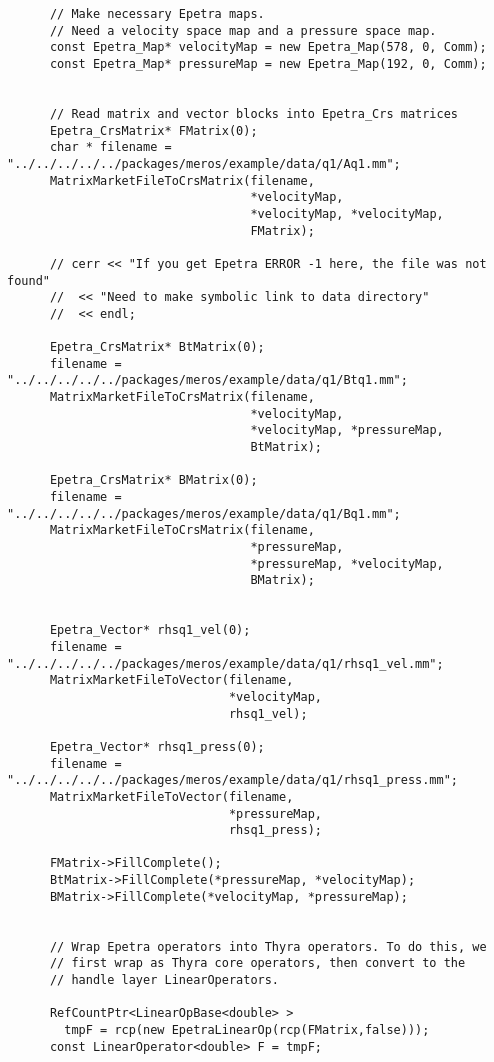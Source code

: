 \begin{verbatim}
      // Make necessary Epetra maps.
      // Need a velocity space map and a pressure space map.
      const Epetra_Map* velocityMap = new Epetra_Map(578, 0, Comm); 
      const Epetra_Map* pressureMap = new Epetra_Map(192, 0, Comm); 
 

      // Read matrix and vector blocks into Epetra_Crs matrices
      Epetra_CrsMatrix* FMatrix(0);
      char * filename = "../../../../../packages/meros/example/data/q1/Aq1.mm";
      MatrixMarketFileToCrsMatrix(filename,
                                  *velocityMap,
                                  *velocityMap, *velocityMap,
                                  FMatrix);

      // cerr << "If you get Epetra ERROR -1 here, the file was not found"
      //  << "Need to make symbolic link to data directory" 
      //  << endl;

      Epetra_CrsMatrix* BtMatrix(0);
      filename = "../../../../../packages/meros/example/data/q1/Btq1.mm";
      MatrixMarketFileToCrsMatrix(filename,
                                  *velocityMap, 
                                  *velocityMap, *pressureMap,
                                  BtMatrix);

      Epetra_CrsMatrix* BMatrix(0);
      filename = "../../../../../packages/meros/example/data/q1/Bq1.mm";
      MatrixMarketFileToCrsMatrix(filename,
                                  *pressureMap,
                                  *pressureMap, *velocityMap,
                                  BMatrix);


      Epetra_Vector* rhsq1_vel(0);
      filename = "../../../../../packages/meros/example/data/q1/rhsq1_vel.mm";
      MatrixMarketFileToVector(filename,
                               *velocityMap, 
                               rhsq1_vel);

      Epetra_Vector* rhsq1_press(0);
      filename = "../../../../../packages/meros/example/data/q1/rhsq1_press.mm";
      MatrixMarketFileToVector(filename,
                               *pressureMap, 
                               rhsq1_press);

      FMatrix->FillComplete();
      BtMatrix->FillComplete(*pressureMap, *velocityMap);
      BMatrix->FillComplete(*velocityMap, *pressureMap);


      // Wrap Epetra operators into Thyra operators. To do this, we
      // first wrap as Thyra core operators, then convert to the
      // handle layer LinearOperators.
      
      RefCountPtr<LinearOpBase<double> >
        tmpF = rcp(new EpetraLinearOp(rcp(FMatrix,false)));
      const LinearOperator<double> F = tmpF;


\end{verbatim}
